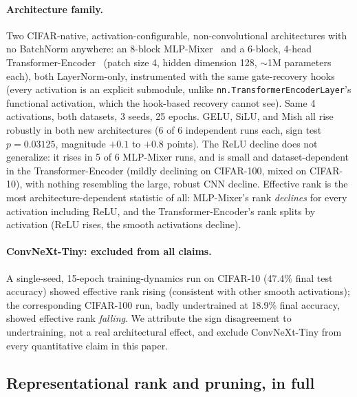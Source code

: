 \paragraph{Architecture family.} Two CIFAR-native, activation-configurable,
non-convolutional architectures with no BatchNorm anywhere: an 8-block
MLP-Mixer~\citep{tolstikhin2021mixer} and a 6-block, 4-head
Transformer-Encoder~\citep{vaswani2017attention} (patch size 4, hidden
dimension 128, $\sim$1M parameters each), both LayerNorm-only, instrumented
with the same gate-recovery hooks (every activation is an explicit
submodule, unlike \texttt{nn.TransformerEncoderLayer}'s functional
activation, which the hook-based recovery cannot see). Same 4 activations,
both datasets, 3 seeds, 25 epochs. GELU, SiLU, and Mish all rise robustly
in both new architectures (6 of 6 independent runs each, sign test
$p=0.03125$, magnitude $+0.1$ to $+0.8$ points). The ReLU decline does not
generalize: it rises in 5 of 6 MLP-Mixer runs, and is small and
dataset-dependent in the Transformer-Encoder (mildly declining on
CIFAR-100, mixed on CIFAR-10), with nothing resembling the large, robust
CNN decline. Effective rank is the most architecture-dependent statistic of
all: MLP-Mixer's rank \emph{declines} for every activation including ReLU,
and the Transformer-Encoder's rank splits by activation (ReLU rises, the
smooth activations decline).

\paragraph{ConvNeXt-Tiny: excluded from all claims.} A single-seed,
15-epoch training-dynamics run on CIFAR-10 (47.4\% final test accuracy)
showed effective rank rising (consistent with other smooth activations);
the corresponding CIFAR-100 run, badly undertrained at 18.9\% final
accuracy, showed effective rank \emph{falling}. We attribute the sign
disagreement to undertraining, not a real architectural effect, and
exclude ConvNeXt-Tiny from every quantitative claim in this paper.

\subsection{Representational rank and pruning, in full}
\label{app:rank-pruning}

